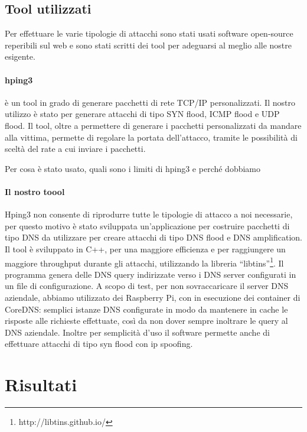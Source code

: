 \subsection{Tool utilizzati}

Per effettuare le varie tipologie di attacchi sono stati usati software open-source reperibili sul web e sono stati scritti dei tool per adeguarsi al meglio alle nostre esigente.

\paragraph{hping3} è un tool in grado di generare pacchetti di rete TCP/IP personalizzati. Il nostro utilizzo è stato per generare attacchi di tipo SYN flood, ICMP flood e UDP flood. Il tool, oltre a permettere di generare i pacchetti personalizzati da mandare alla vittima, permette di regolare la portata dell'attacco, tramite le possibilità di sceltà del rate a cui inviare i pacchetti.


Per cosa è stato usato, quali sono i limiti di hping3 e perché dobbiamo

\paragraph{Il nostro toool}

Hping3 non consente di riprodurre tutte le tipologie di attacco a noi necessarie, per questo motivo è stato sviluppata un'applicazione per costruire pacchetti di tipo DNS da utilizzare per creare attacchi di tipo DNS flood e DNS amplification.
Il tool è sviluppato in C++, per una maggiore efficienza e per raggiungere un maggiore throughput durante gli attacchi, utilizzando la libreria ``libtins''\footnote{ http://libtins.github.io/}.
Il programma genera delle DNS query indirizzate verso i DNS server configurati in un file di configurazione. A scopo di test, per non sovraccaricare il server DNS aziendale, abbiamo utilizzato dei Raspberry Pi, con in esecuzione dei container di CoreDNS: semplici istanze DNS configurate in modo da mantenere in cache le risposte alle richieste effettuate, così da non dover sempre inoltrare le query al DNS aziendale.
Inoltre per semplicità d'uso il software permette anche di effettuare attacchi di tipo syn flood con ip spoofing.


\section{Risultati}

